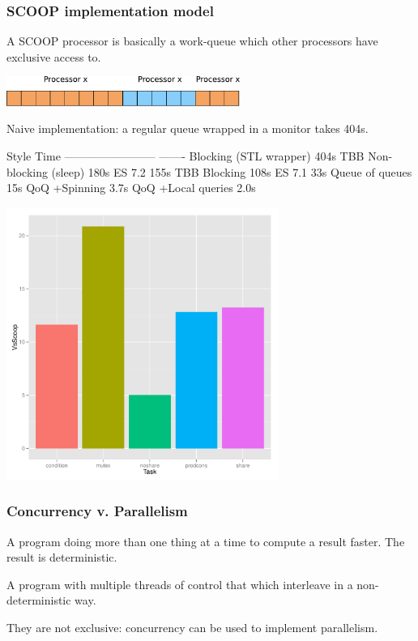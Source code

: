 \documentclass{beamer}
\begin{document}
\begin{frame}
  \frametitle{SCOOP implementation model}
  
  A SCOOP processor is basically a work-queue which
  other processors have exclusive access to.

  \begin{center}
    \includegraphics[width=3in]{queue-naive}
  \end{center}

  Naive implementation: a regular queue wrapped in a monitor
  takes 404s.
\end{frame}

\begin{frame}
                   Style      Time  
------------------------   -------
Blocking (STL wrapper)        404s
TBB Non-blocking (sleep)      180s
ES 7.2                        155s
TBB Blocking                  108s
ES 7.1                         33s
Queue of queues                15s
QoQ +Spinning                 3.7s
QoQ +Local queries            2.0s
\end{frame}

\begin{frame}
  \begin{center}
    \includegraphics[width=3.5in]{share-bar}
  \end{center}
\end{frame}

\begin{frame}
  \frametitle{Concurrency v. Parallelism}
  \begin{definition}[Parallelism]
    A program doing more than one thing at a time to compute a result faster.
    The result is deterministic.
  \end{definition}

  \begin{definition}[Concurrency]
    A program with multiple threads of control that which 
    interleave in a non-deterministic way.
  \end{definition}

  They are not exclusive: concurrency can be used to implement parallelism.
\end{frame}
\end{document}
